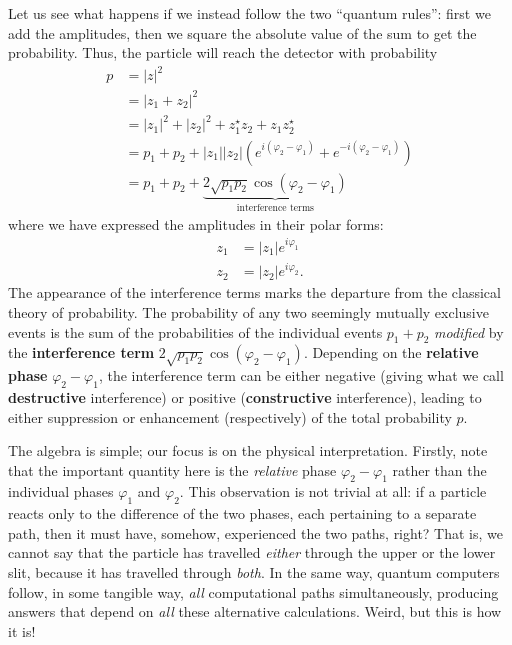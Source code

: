 \documentclass[fleqn,a4paper]{article}
\theoremstyle{definition}
\theoremstyle{definition}
\theoremstyle{definition}
\theoremstyle{definition}
\theoremstyle{remark}
\begin{document}
Let us see what happens if we instead follow the two ``quantum rules'': first we add the amplitudes, then we square the absolute value of the sum to get the probability.
Thus, the particle will reach the detector with probability
\[
  \begin{aligned}
    p &= |z|^2
  \\& = |z_1 + z_2|^2
  \\& = |z_1|^2 + |z_2|^2
        + z_1^\star z_2 + z_1 z_2^\star
  \\& = p_1 + p_2
        + |z_1||z_2|\left(
          e^{i(\varphi_2-\varphi_1)}
          + e^{-i(\varphi_2-\varphi_1)}
        \right)
  \\& = p_1 + p_2
        + \underbrace{2 \sqrt{p_1 p_2} \cos(\varphi_2-\varphi_1)}_{\text{interference terms}}
  \end{aligned}
\tag{$\ddagger$}
\]
where we have expressed the amplitudes in their polar forms:
\[
\begin{aligned}
  z_1 &= |z_1|e^{i\varphi_1}
\\z_2 &= |z_2|e^{i\varphi_2}.
\end{aligned}
\]
The appearance of the interference terms marks the departure from the classical theory of probability.
The probability of any two seemingly mutually exclusive events is the sum of the probabilities of the individual events \(p_1 + p_2\) \emph{modified} by the \textbf{interference term} \(2\sqrt{p_1p_2}\cos(\varphi_2-\varphi_1)\).
Depending on the \textbf{relative phase} \(\varphi_2-\varphi_1\), the interference term can be either negative (giving what we call \textbf{destructive} interference) or positive (\textbf{constructive} interference), leading to either suppression or enhancement (respectively) of the total probability \(p\).

The algebra is simple; our focus is on the physical interpretation.
Firstly, note that the important quantity here is the \emph{relative} phase \(\varphi_2-\varphi_1\) rather than the individual phases \(\varphi_1\) and \(\varphi_2\).
This observation is not trivial at all: if a particle reacts only to the difference of the two phases, each pertaining to a separate path, then it must have, somehow, experienced the two paths, right?
That is, we cannot say that the particle has travelled \emph{either} through the upper or the lower slit, because it has travelled through \emph{both}.
In the same way, quantum computers follow, in some tangible way, \emph{all} computational paths simultaneously, producing answers that depend on \emph{all} these alternative calculations.
Weird, but this is how it is!
\end{document}

